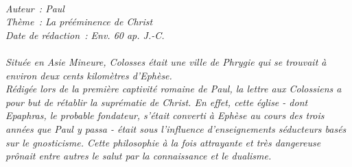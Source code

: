 \BFont
\noindent\hrulefill
{\footnotesize
\textit{
\bigskip
{\centering{}
\\Auteur~: Paul
\\Thème~: La prééminence de Christ
\\Date de rédaction~: Env. 60 ap. J.-C.\\}
}
\textit{
\\Située en Asie Mineure, Colosses était une ville de Phrygie qui se trouvait à environ deux cents kilomètres d'Ephèse.
\\Rédigée lors de la première captivité romaine de Paul, la lettre aux Colossiens a pour but de rétablir la suprématie de Christ. En effet, cette église - dont Epaphras, le probable fondateur, s'était converti à Ephèse au cours des trois années que Paul y passa - était sous l'influence d'enseignements séducteurs basés sur le gnosticisme. Cette philosophie à la fois attrayante et très dangereuse prônait entre autres le salut par la connaissance et le dualisme.\bigskip
}
}
\par\nobreak\noindent\hrulefill
